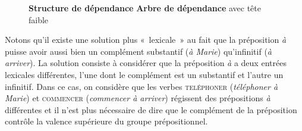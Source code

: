 \begin{figure}

    \textbf{Structure de dépendance}      \textbf{Arbre de dépendance}
        avec tête faible
    \caption{\label{fig:}}
\end{figure}

Notons qu’il existe une solution plus «~lexicale~» au fait que la préposition \textit{à} puisse avoir aussi bien un complément substantif (\textit{à Marie}) qu’infinitif (\textit{à arriver}). La solution consiste à considérer que la préposition \textit{à} a deux entrées lexicales différentes, l’une dont le complément est un substantif et l’autre un infinitif. Dans ce cas, on considère que les verbes \textsc{teléphoner} (\textit{téléphoner à Marie}) et \textsc{commencer} (\textit{commencer à arriver}) régissent des prépositions \textit{à} différentes et il n’est plus nécessaire de dire que le complément de la préposition contrôle la valence supérieure du groupe prépositionnel.



